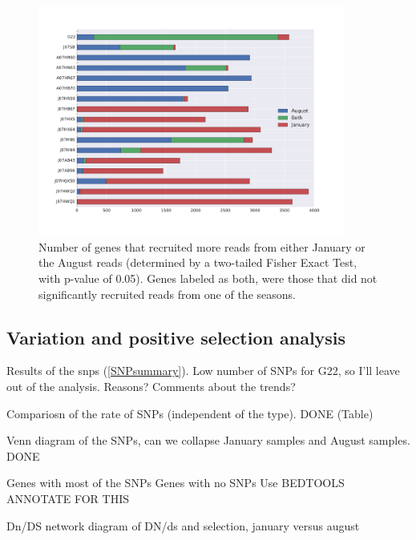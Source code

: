 \begin{figure}[!hbtp]
  \centering
  \includegraphics[width=0.9\textwidth]{Chapter5/Figures/GeneDifferencesSeason.pdf}
  \caption{Number of genes that recruited more reads from either January or the August reads (determined by a two-tailed Fisher Exact Test, with p-value of 0.05). Genes labeled as both, were those that did not significantly recruited reads from one of the seasons.}
  \label{CoverageGenes}
\end{figure}


\clearpage
\subsection{Variation and positive selection analysis}

Results of the snps (\ref{SNPsummary}). Low number of SNPs for G22, so I'll leave out of the analysis. Reasons?
Comments about the trends?

Compariosn of the rate of SNPs (independent of the type). DONE (Table)

Venn diagram of the SNPs, can we collapse January samples and August samples. DONE


Genes with most of the SNPs
Genes with no SNPs 
Use BEDTOOLS ANNOTATE FOR THIS



Dn/DS
network diagram of DN/ds and selection, january versus august


